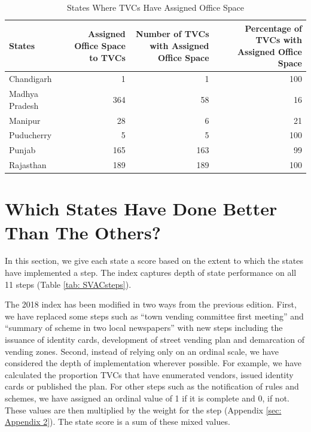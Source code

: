 \documentclass[a4paper, 12pt, twoside]{article}
\begin{document}
{%
\begin{table}[htpb]
\caption{States Where TVCs Have Assigned Office Space}
\label{tab: OfficeSpace}
\begin{tabular}{ l  r r r } %
\toprule
States & \multicolumn{1}{p{9em}}{Assigned Office Space to TVCs} & \multicolumn{1}{p{9em}}{Number of TVCs with Assigned Office Space} & \multicolumn{1}{p{9em}}{Percentage of TVCs with Assigned Office Space}\\
\midrule
Chandigarh & 1 & 1 & 100\\
Madhya Pradesh & 364 & 58 & 16\\
Manipur & 28 & 6 & 21\\
Puducherry & 5 & 5 & 100\\
Punjab & 165 & 163 & 99\\
Rajasthan & 189 & 189 & 100\\
\bottomrule
\end{tabular}
\end{table}

\section*{Which States Have Done Better Than The Others?}
	In this section, we give each state a score based on the extent to which the states have implemented a step. The index captures depth of state performance on all 11 steps (Table \ref{tab: SVACsteps}).

	The 2018 index has been modified in two ways from the previous edition. First, we have replaced some steps such as “town vending committee first meeting”  and “summary of scheme in two local newspapers” with new steps including the issuance of identity cards, development of street vending plan and demarcation of vending zones. Second, instead of relying only on an ordinal scale, we have considered the depth of implementation wherever possible. For example, we have calculated the proportion TVCs that have enumerated vendors, issued identity cards or published the plan. For other steps such as the notification of rules and schemes, we have assigned an ordinal value of 1 if it is complete and 0, if not. These values are then multiplied by the weight for the step (Appendix \ref{sec: Appendix 2}). The state score is a sum of these mixed values.

}
\end{document}
